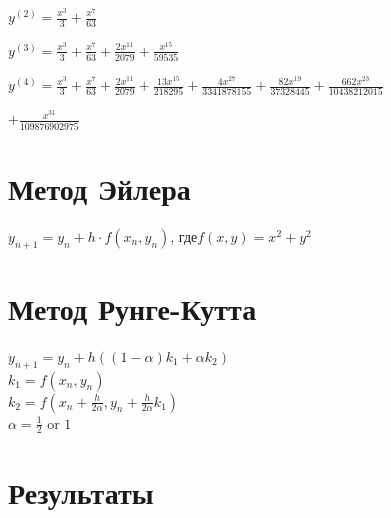 \documentclass[14pt, a4paper]{extarticle}
\begin{document}
$y^{(2)}=\frac{x^3}{3} + \frac{x^7}{63}$

$y^{(3)}=\frac{x^3}{3}+ \frac{x^7}{63} + \frac{2x^{11}}{2079} + \frac{x^{15}}{59535}$

$y^{(4)}=\frac{x^3}{3}+ \frac{x^7}{63} + \frac{2x^{11}}{2079} + \frac{13x^{15}}{218295} + \frac{4x^{27}}{3341878155} + \frac{82x^{19}}{37328445} +  \frac{662x^{23}}{10438212015}$

$+\frac{x^{31}}{109876902975}$
\section{Метод Эйлера}
$y_{n+1}=y_n+h\cdot f(x_n,y_n)$, где$f(x,y)=x^2+y^2$
\section{Метод Рунге-Кутта}
\noindent$y_{n+1} = y_n + h ((1 - \alpha)k_1 + \alpha k_2)$\\
$k_1 = f(x_n, y_n)$\\
$k_2 = f(x_n + \frac{h}{2\alpha}, y_n + \frac{h}{2\alpha}k_1)$\\
$\alpha = \frac{1}{2}$ or $1$

\section*{Результаты}
\begin{figure}[h!]
\end{figure}
\newpage
\end{document}
